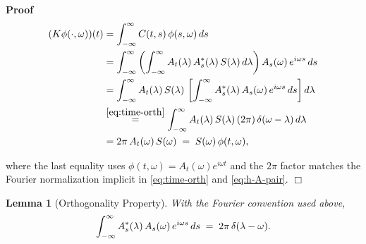 \documentclass{article}
\newenvironment{proof}{\noindent\textbf{Proof\ }}{\hspace*{\fill}$\Box$\medskip}
\newtheorem{lemma}{Lemma}
\begin{document}
\begin{proof}
  \begin{align*}
    (K \phi (\cdot, \omega)) (t) & = \int_{- \infty}^{\infty} C (t, s) 
    \hspace{0.17em} \phi (s, \omega)  \hspace{0.17em} ds\\
    & = \int_{- \infty}^{\infty} \left( \int_{- \infty}^{\infty} A_t
    (\lambda) \hspace{0.17em} A_s^{\ast} (\lambda) \hspace{0.17em} S (\lambda)
    \hspace{0.17em} d \lambda \right) A_s (\omega)  \hspace{0.17em} e^{i
    \omega s}  \hspace{0.17em} ds\\
    & = \int_{- \infty}^{\infty} A_t (\lambda)  \hspace{0.17em} S (\lambda)
    \hspace{0.17em} \left[ \int_{- \infty}^{\infty} A_s^{\ast} (\lambda)
    \hspace{0.17em} A_s (\omega) \hspace{0.17em} e^{i \omega s} 
    \hspace{0.17em} ds \right] d \lambda\\
    & \overset{\eqref{eq:time-orth}}{=} \int_{- \infty}^{\infty} A_t
    (\lambda)  \hspace{0.17em} S (\lambda)  \hspace{0.17em} (2 \pi) 
    \hspace{0.17em} \delta (\omega - \lambda)  \hspace{0.17em} d \lambda\\
    & = 2 \pi \hspace{0.17em} A_t (\omega)  \hspace{0.17em} S (\omega)
    \hspace{0.27em} = \hspace{0.27em} S (\omega)  \hspace{0.17em} \phi (t,
    \omega),
  \end{align*}
  
  where the last equality uses $\phi (t, \omega) = A_t (\omega) e^{i \omega
  t}$ and the $2 \pi$ factor matches the Fourier normalization implicit in
  \eqref{eq:time-orth} and \eqref{eq:h-A-pair}.
\end{proof}

\begin{lemma}[Orthogonality Property]
  With the Fourier convention used above,
  \[ \int_{- \infty}^{\infty} A_s^{\ast} (\lambda)  \hspace{0.17em} A_s
     (\omega)  \hspace{0.17em} e^{i \omega s}  \hspace{0.17em} ds
     \hspace{0.27em} = \hspace{0.27em} 2 \pi \hspace{0.17em} \delta (\lambda -
     \omega) . \]
\end{lemma}
\end{document}
